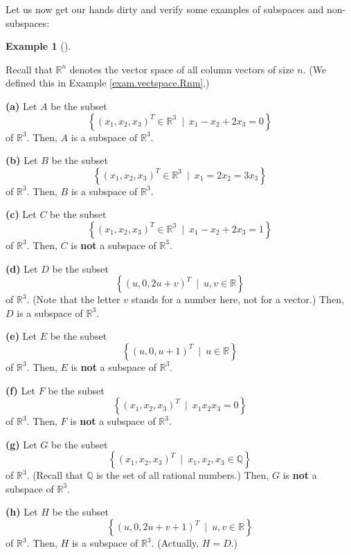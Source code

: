 \documentclass[numbers=enddot,12pt,final,onecolumn,notitlepage]{scrartcl}%
\theoremstyle{definition}
\newtheorem{exam}[theo]{Example}
\newenvironment{example}[1][]
{\begin{exam}[#1]\begin{leftbar}}
{\end{leftbar}\end{exam}}
\begin{document}
Let us now get our hands dirty and verify some examples of subspaces and non-subspaces:

\begin{example}
\label{exam.subspace.R3}Recall that $\mathbb{R}^{n}$ denotes the vector space
of all column vectors of size $n$. (We defined this in Example
\ref{exam.vectspace.Rnm}.)

\textbf{(a)} Let $A$ be the subset
\[
\left\{  \left(  x_{1},x_{2},x_{3}\right)  ^{T}\in\mathbb{R}^{3}\ \mid
\ x_{1}-x_{2}+2x_{3}=0\right\}
\]
of $\mathbb{R}^{3}$. Then, $A$ is a subspace of $\mathbb{R}^{3}$.

\textbf{(b)} Let $B$ be the subset%
\[
\left\{  \left(  x_{1},x_{2},x_{3}\right)  ^{T}\in\mathbb{R}^{3}\ \mid
\ x_{1}=2x_{2}=3x_{3}\right\}
\]
of $\mathbb{R}^{3}$. Then, $B$ is a subspace of $\mathbb{R}^{3}$.

\textbf{(c)} Let $C$ be the subset%
\[
\left\{  \left(  x_{1},x_{2},x_{3}\right)  ^{T}\in\mathbb{R}^{3}\ \mid
\ x_{1}-x_{2}+2x_{3}=1\right\}
\]
of $\mathbb{R}^{3}$. Then, $C$ is \textbf{not} a subspace of $\mathbb{R}^{3}$.

\textbf{(d)} Let $D$ be the subset%
\[
\left\{  \left(  u,0,2u+v\right)  ^{T}\ \mid\ u,v\in\mathbb{R}\right\}
\]
of $\mathbb{R}^{3}$. (Note that the letter $v$ stands for a number here, not
for a vector.) Then, $D$ is a subspace of $\mathbb{R}^{3}$.

\textbf{(e)} Let $E$ be the subset%
\[
\left\{  \left(  u,0,u+1\right)  ^{T}\ \mid\ u\in\mathbb{R}\right\}
\]
of $\mathbb{R}^{3}$. Then, $E$ is \textbf{not} a subspace of $\mathbb{R}^{3}$.

\textbf{(f)} Let $F$ be the subset%
\[
\left\{  \left(  x_{1},x_{2},x_{3}\right)  ^{T}\ \mid\ x_{1}x_{2}%
x_{3}=0\right\}
\]
of $\mathbb{R}^{3}$. Then, $F$ is \textbf{not} a subspace of $\mathbb{R}^{3}$.

\textbf{(g)} Let $G$ be the subset%
\[
\left\{  \left(  x_{1},x_{2},x_{3}\right)  ^{T}\ \mid\ x_{1},x_{2},x_{3}%
\in\mathbb{Q}\right\}
\]
of $\mathbb{R}^{3}$. (Recall that $\mathbb{Q}$ is the set of all rational
numbers.) Then, $G$ is \textbf{not} a subspace of $\mathbb{R}^{3}$.

\textbf{(h)} Let $H$ be the subset%
\[
\left\{  \left(  u,0,2u+v+1\right)  ^{T}\ \mid\ u,v\in\mathbb{R}\right\}
\]
of $\mathbb{R}^{3}$. Then, $H$ is a subspace of $\mathbb{R}^{3}$. (Actually,
$H=D$.)
\end{example}
\end{document}

